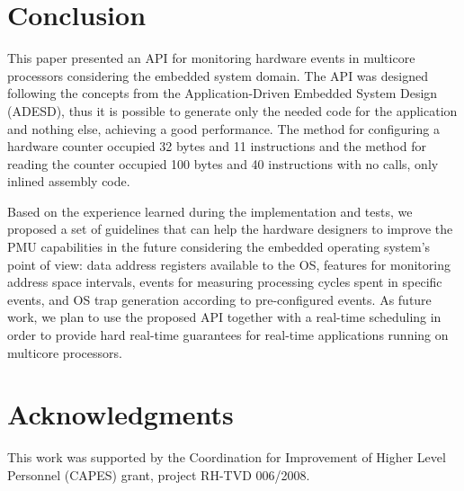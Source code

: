 \documentclass[conference]{IEEEtran}
\begin{document}
\section{Conclusion}
\label{sec:conc}

This paper presented an API for monitoring hardware events in multicore processors considering the embedded system domain. The API was designed following the concepts from the Application-Driven Embedded System Design (ADESD), thus it is possible to generate only the needed code for the application and nothing else, achieving a good performance. The method for configuring a hardware counter occupied 32 bytes and 11 instructions and the method for reading the counter occupied 100 bytes and 40 instructions with no calls, only inlined assembly code. 

Based on the experience learned during the implementation and tests, we proposed a set of guidelines that can help the hardware designers to improve the PMU capabilities in the future considering the embedded operating system's point of view: data address registers available to the OS, features for monitoring address space intervals, events for measuring processing cycles spent in specific events, and OS trap generation according to pre-configured events. As future work, we plan to use the proposed API together with a real-time scheduling in order to provide hard real-time guarantees for real-time applications running on multicore processors.

\section*{Acknowledgments}
This work was supported by the Coordination for Improvement of Higher Level Personnel (CAPES) grant, project RH-TVD 006/2008.



\end{document}
